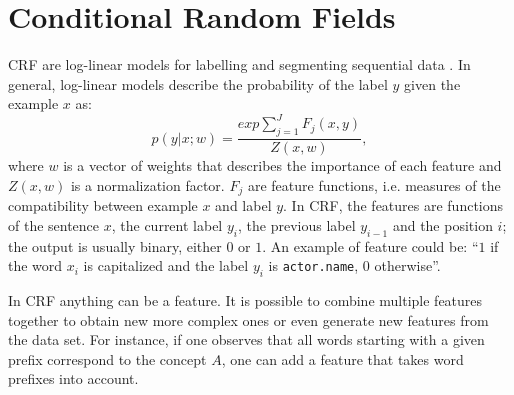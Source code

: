 \section{Conditional Random Fields}
\label{sec:crf}

\ac{CRF} are log-linear models for labelling and segmenting sequential data \cite{elkan}.
In general, log-linear models describe the probability of the label $y$ given the example $x$ as:
\begin{equation*}
    p(y|x;w) = \frac{exp \sum_{j = 1}^{J} F_{j}(x, y)}{Z(x, w)},
\end{equation*}
where $w$ is a vector of weights that describes the importance of each feature and $Z(x,w)$ is a normalization factor.
$F_{j}$ are feature functions, i.e. measures of the compatibility between example $x$ and label $y$.
In \ac{CRF}, the features are functions of the sentence $x$, the current label $y_{i}$, the previous label $y_{i-1}$ and the position $i$;
the output is usually binary, either $0$ or $1$.
An example of feature could be: ``$1$ if the word $x_i$ is capitalized and the label $y_i$ is \texttt{actor.name}, $0$ otherwise''.

In \ac{CRF} anything can be a feature.
It is possible to combine multiple features together to obtain new more complex ones or even generate new features from the data set.
For instance, if one observes that all words starting with a given prefix correspond to the concept $A$, one can add a feature that takes word prefixes into account.
